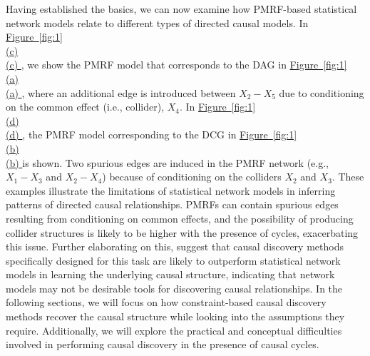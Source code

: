\documentclass[twoside, 11pt]{article}
\newcommand*{\figref}[2][]{%
  \hyperref[{fig:#2}]{%
    Figure~\ref*{fig:#2}%
    \ifx\\#1\\%
    \else
      #1%
    \fi
  }%
}
\begin{document}
Having established the basics, we can now examine how PMRF-based statistical network models relate to different types of directed causal models. In \figref[(c)]{1}, we show the PMRF model that corresponds to the DAG in \figref[(a)]{1}, where an additional edge is introduced between $X_2 - X_5$ due to conditioning on the common effect (i.e., collider), $X_4$. In \figref[(d)]{1}, the PMRF model corresponding to the DCG in \figref[(b)]{1} is shown. Two spurious edges are induced in the PMRF network (e.g., $X_1 - X_3$ and $X_2 - X_4$) because of conditioning on the colliders $X_2$ and $X_3$. These examples illustrate the limitations of statistical network models in inferring patterns of directed causal relationships. PMRFs can contain spurious edges resulting from conditioning on common effects, and the possibility of producing collider structures is likely to be higher with the presence of cycles, exacerbating this issue. 
Further elaborating on this, \cite{Ryan2022} suggest that causal discovery methods specifically designed for this task are likely to outperform statistical network models in learning the underlying causal structure, indicating that network models may not be desirable tools for discovering causal relationships.
In the following sections, we will focus on how constraint-based causal discovery methods recover the causal structure while looking into the assumptions they require. Additionally, we will explore the practical and conceptual difficulties involved in performing causal discovery in the presence of causal cycles.
\end{document}
